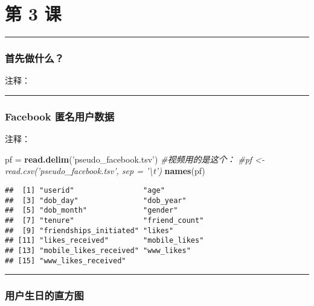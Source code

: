 \documentclass[]{article}
\title{}
\author{}
\date{}
\newenvironment{Shaded}{\begin{snugshade}}{\end{snugshade}}
\newcommand{\CommentTok}[1]{\textcolor[rgb]{0.56,0.35,0.01}{\textit{#1}}}
\newcommand{\KeywordTok}[1]{\textcolor[rgb]{0.13,0.29,0.53}{\textbf{#1}}}
\newcommand{\NormalTok}[1]{#1}
\newcommand{\StringTok}[1]{\textcolor[rgb]{0.31,0.60,0.02}{#1}}
\begin{document}
\hypertarget{-3-}{%
\section{第 3 课}\label{-3-}}

\begin{center}\rule{0.5\linewidth}{\linethickness}\end{center}

\subsubsection{首先做什么？}

注释：

\begin{center}\rule{0.5\linewidth}{\linethickness}\end{center}

\hypertarget{facebook-}{%
\subsubsection{Facebook 匿名用户数据}\label{facebook-}}

注释：

\begin{Shaded}
\begin{Highlighting}[]
\NormalTok{pf =}\StringTok{ }\KeywordTok{read.delim}\NormalTok{(}\StringTok{'pseudo_facebook.tsv'}\NormalTok{)}
\CommentTok{#视频用的是这个：}
\CommentTok{#pf <- read.csv('pseudo_facebook.tsv', sep = '\textbackslash{}t')}
\KeywordTok{names}\NormalTok{(pf)}
\end{Highlighting}
\end{Shaded}

\begin{verbatim}
##  [1] "userid"                "age"                  
##  [3] "dob_day"               "dob_year"             
##  [5] "dob_month"             "gender"               
##  [7] "tenure"                "friend_count"         
##  [9] "friendships_initiated" "likes"                
## [11] "likes_received"        "mobile_likes"         
## [13] "mobile_likes_received" "www_likes"            
## [15] "www_likes_received"
\end{verbatim}

\begin{center}\rule{0.5\linewidth}{\linethickness}\end{center}

\subsubsection{用户生日的直方图}
\end{document}
